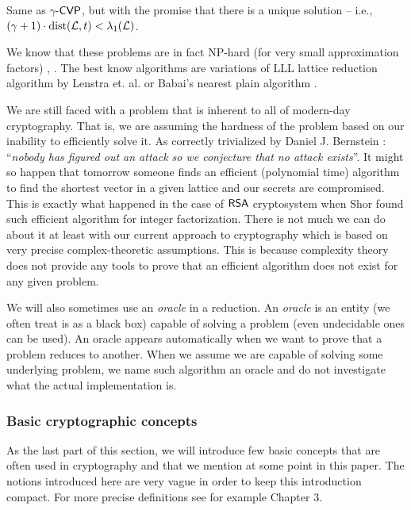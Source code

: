 \begin{definition}
	Same as $\gamma$-$\textsf{CVP}$, but with the promise that there is a unique solution -- i.e., $(\gamma +1) \cdot \text{dist}(\mathcal{L}, t) < \lambda_1(\mathcal{L})$.
\end{definition}

We know that these problems are in fact NP-hard (for very small approximation factors) \cite{gentry}, \cite{bdd}. The best know algorithms are variations of LLL lattice reduction algorithm by Lenstra et. al. \cite{lenstra} or Babai's nearest plain algorithm \cite{babai}.

\begin{remark}
	We are still faced with a problem that is inherent to all of modern-day cryptography. That is, we are assuming the hardness of the problem based on our inability to efficiently solve it. As correctly trivialized by Daniel J. Bernstein \cite{bernstein}: ``\textit{nobody has figured out an attack so we conjecture that no attack exists}''. It might so happen that tomorrow someone finds an efficient (polynomial time) algorithm to find the shortest vector in a given lattice and our secrets are compromised. This is exactly what happened in the case of $\textsf{RSA}$ cryptosystem when Shor found such efficient algorithm for integer factorization. There is not much we can do about it at least with our current approach to cryptography which is based on very precise complex-theoretic assumptions. This is because complexity theory does not provide any tools to prove that an efficient algorithm does not exist for any given problem.
\end{remark}

We will also sometimes use an \textit{oracle} in a reduction. An \textit{oracle} is an entity (we often treat is as a black box) capable of solving a problem (even undecidable ones can be used). An oracle appears automatically when we want to prove that a problem reduces to another. When we assume we are capable of solving some underlying problem, we name such algorithm an oracle and do not investigate what the actual implementation is.

\subsubsection*{Basic cryptographic concepts}
As the last part of this section, we will introduce few basic concepts that are often used in cryptography and that we mention at some point in this paper. The notions introduced here are very vague in order to keep this introduction compact. For more precise definitions see for example \cite{katz} Chapter 3.

